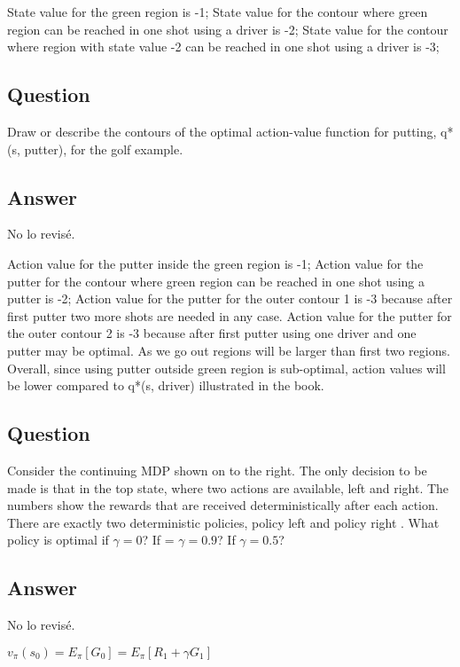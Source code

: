 \documentclass[11pt]{article}
\def\red{\color{red}}
\begin{document}
    State value for the green region is -1;
    State value for the contour where green region can be reached in one shot using a driver is -2;
    State value for the contour where region with state value -2 can be reached in one shot using a driver is -3;

    \subsection{Question}

    Draw or describe the contours of the optimal action-value function for putting, q*(s, putter), for the golf example.

    \subsection*{Answer}
    {\red No lo revisé.}

    Action value for the putter inside the green region is -1;
    Action value for the putter for the contour where green region can be reached in one shot using a putter is -2;
    Action value for the putter for the outer contour 1 is -3 because after first putter two more shots are needed in any case.
    Action value for the putter for the outer contour 2 is -3 because after first putter using one driver and one putter may be optimal.
    As we go out regions will be larger than first two regions.
    Overall, since using putter outside green region is sub-optimal, action values will be lower compared to q*(s, driver) illustrated in the book.

    \subsection{Question}

    Consider the continuing MDP shown on to the right.
    The only decision to be made is that in the top state, where two actions are available, left and right.
    The numbers show the rewards that are received deterministically after each action.
    There are exactly two deterministic policies, policy left and policy right .
    What policy is optimal if $\gamma = 0$? If = $\gamma = 0.9$? If $\gamma = 0.5$?

    \subsection*{Answer}
    {\red No lo revisé.}

    $ v_{\pi}(s_{0}) = E_{\pi}[G_{0}] =  E_{\pi}[R_{1} + \gamma G_{1}] $
\end{document}
